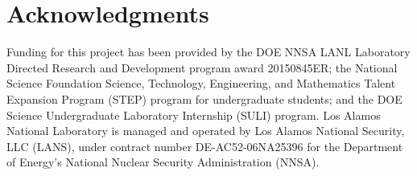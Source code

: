 \documentclass{llncs}
\begin{document}
\section{Acknowledgments}

Funding for this project has been provided by the DOE NNSA LANL Laboratory
Directed Research and Development program award 20150845ER; the National
Science Foundation Science, Technology, Engineering, and Mathematics Talent
Expansion Program (STEP) program for undergraduate students; and the DOE
Science Undergraduate Laboratory Internship (SULI) program.
%
Los Alamos National Laboratory is managed and operated by Los Alamos National
Security, LLC (LANS), under contract number DE-AC52-06NA25396 for the
Department of Energy’s National Nuclear Security Administration (NNSA).


%
%




\end{document}
